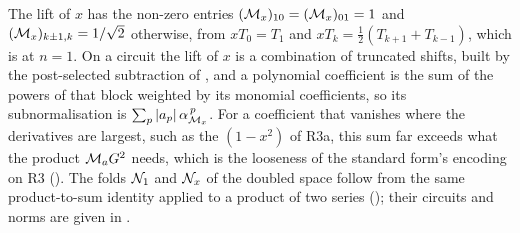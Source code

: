 The lift of $x$ has the non-zero entries $(\mathcal{M}_x)_{10}=(\mathcal{M}_x)_{01}=1$ and $(\mathcal{M}_x)_{k\pm1,k}=1/\sqrt2$ otherwise, from $xT_0=T_1$ and $xT_k=\tfrac12(T_{k+1}+T_{k-1})$, which is  at $n=1$. On a circuit the lift of $x$ is a combination of truncated shifts, built by the post-selected subtraction of , and a polynomial coefficient is the sum of the powers of that block weighted by its monomial coefficients, so its subnormalisation is $\sum_p|a_p|\,\alpha_{\mathcal{M}_x}^{\,p}$. For a coefficient that vanishes where the derivatives are largest, such as the $(1-x^2)$ of R3a, this sum far exceeds what the product $\mathcal{M}_aG^2$ needs, which is the looseness of the standard form's encoding on R3 (). The folds $\mathcal{N}_1$ and $\mathcal{N}_x$ of the doubled space follow from the same product-to-sum identity applied to a product of two series (); their circuits and norms are given in .

